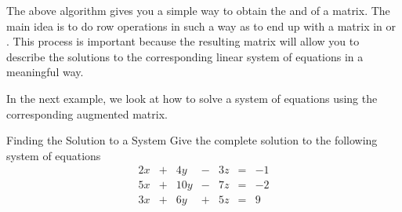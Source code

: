 

The above algorithm gives you a simple way to obtain the \ef \;and \rref \;of a matrix.
The main idea is to do row operations in such a way as to end up with a
matrix in \ef \;or \rref. This process is important because the resulting matrix will 
allow you to describe the
solutions to the corresponding linear system of equations in a meaningful way. 

In the next example, we look at how to solve a system of equations using the corresponding augmented matrix.

\begin{example}{Finding the Solution to a System}\label{exa:systemwithnosoln}
Give the complete solution to the following system of equations \:
\begin{equation*}
\begin{array}{ccccccccc}
2x&+&4y&-&3z&=&-1\\
5x&+&10y&-&7z&=&-2\\
3x&+&6y&+&5z&=&9
\end{array}
\end{equation*}
\end{example}

